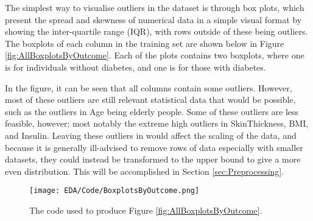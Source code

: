 \para The simplest way to visualise outliers in the dataset is through box plots, which present the spread and skewness of numerical 
data in a simple visual format by showing the inter-quartile range (IQR), with rows outside of these being outliers. 
The boxplots of each column in the training set are shown below in Figure \ref{fig:AllBoxplotsByOutcome}. Each of the plots 
contains two boxplots, where one is for individuals without diabetes, and one is for those with diabetes.

\para In the figure, it can be seen that all columns contain some outliers.
However, most of these outliers are still relevant statistical data that would be possible, such as the outliers 
in Age being elderly people. Some of these outliers are less feasible, however; most notably the extreme high outliers 
in SkinThickness, BMI, and Insulin. Leaving these outliers in would affect the scaling of the data, and because it is generally 
ill-advised to remove rows of data especially with smaller datasets, they could instead be transformed to the upper bound to give 
a more even distribution. This will be accomplished in Section \ref{sec:Preprocessing}.

\begin{figure}[H]
    \centering
    \texttt{[image: EDA/Code/BoxplotsByOutcome.png]}
    \caption{The code used to produce Figure \ref{fig:AllBoxplotsByOutcome}.}
    \label{fig:BoxplotsByOutcomeCode}
\end{figure}


